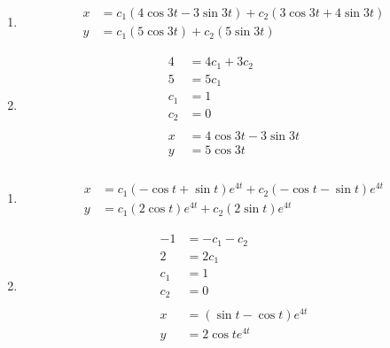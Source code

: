 \documentclass{article}
\begin{document}
\begin{enumerate}
  \item

        \begin{align*}
          x & = c_1 (4 \cos 3 t - 3 \sin 3 t) + c_2 (3 \cos 3 t + 4 \sin 3 t) \\
          y & = c_1 (5 \cos 3 t) + c_2 (5 \sin 3 t)
        \end{align*}

  \item

        \begin{align*}
          4   & = 4 c_1 + 3 c_2           \\
          5   & = 5 c_1                   \\
          c_1 & = 1                       \\
          c_2 & = 0                       \\ \\
          x   & = 4 \cos 3 t - 3 \sin 3 t \\
          y   & = 5 \cos 3 t
        \end{align*}
\end{enumerate}

\setcounter{subsubsection}{20}
\subsubsection{}

\begin{enumerate}
  \item

        \begin{align*}
          x & = c_1 (-\cos t + \sin t) e^{4 t} + c_2 (-\cos t - \sin t) e^{4 t} \\
          y & = c_1 (2 \cos t) e^{4 t} + c_2 (2 \sin t) e^{4 t}
        \end{align*}

  \item

        \begin{align*}
          -1  & = -c_1 - c_2                \\
          2   & = 2 c_1                     \\
          c_1 & = 1                         \\
          c_2 & = 0                         \\ \\
          x   & = (\sin t - \cos t) e^{4 t} \\
          y   & = 2 \cos t e^{4 t}
        \end{align*}
\end{enumerate}
\end{document}
